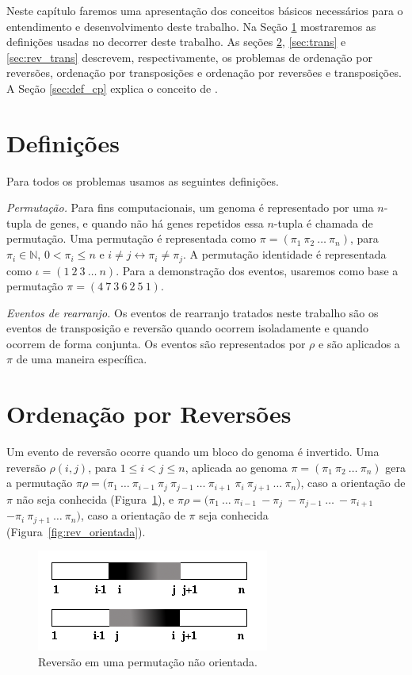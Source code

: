 Neste capítulo faremos uma apresentação dos conceitos básicos
necessários para o entendimento e desenvolvimento deste trabalho. Na
Seção \ref{sec:defin} mostraremos as definições usadas no decorrer
deste trabalho. As seções \ref{sec:rev}, \ref{sec:trans}
e \ref{sec:rev_trans} descrevem, respectivamente, os problemas de
ordenação por reversões, ordenação por transposições e ordenação por
reversões e transposições. A Seção \ref{sec:def_cp} explica o conceito
de \pr{}.

\section{Definições}
\label{sec:defin}
Para todos os problemas usamos as seguintes definições.

\textit{Permutação.} 
Para fins computacionais, um genoma é representado por uma $n$-tupla
de genes, e quando não há genes repetidos essa $n$-tupla é chamada de
permutação. Uma permutação é representada como $\pi =
(\pi_{1}~\pi_{2}~\ldots~\pi_{n})$, para $\pi_{i} \in \mathbb{N}$, $0
< \pi_{i} \leq n$ e $i \neq j \leftrightarrow \pi_{i} \neq \pi_{j}$. A
permutação identidade é representada como $\iota =
(1~2~3~\ldots~n)$. Para a demonstração dos eventos, usaremos como
base a permutação $\pi = (4~7~3~6~2~5~1)$.

\textit{Eventos de rearranjo.}
Os eventos de rearranjo tratados neste trabalho são os eventos de
transposição e reversão quando ocorrem isoladamente e quando ocorrem
de forma conjunta. Os eventos são representados por $\rho$ e são
aplicados a $\pi$ de uma maneira específica.

\section{Ordenação por Reversões}
\label{sec:rev}
Um evento de reversão ocorre quando um bloco do genoma é
invertido. Uma reversão $\rho(i, j)$, para $1 \leq i < j \leq n$,
aplicada ao genoma $\pi = (\pi_{1}~\pi_{2}~\ldots~\pi_{n})$ gera a
permutação $\pi\rho =
(\pi_{1}~\ldots~\pi_{i-1}~\pi_{j}~\pi_{j-1}~\ldots~\pi_{i+1}$
$\pi_{i}~ \pi_{j+1}~\ldots~\pi_{n})$, caso a orientação de $\pi$ não
seja conhecida (Figura~\ref{fig:rev_nao_orientada}), e $\pi\rho =
(\pi_{1}~\ldots~\pi_{i-1}~-\pi_{j}~-\pi_{j-1}~\ldots~-\pi_{i+1}$
$-\pi_{i}~ \pi_{j+1}~\ldots~\pi_{n})$, caso a orientação de $\pi$ seja
conhecida (Figura~\ref{fig:rev_orientada}).

\begin{figure}
  \centering
  \includegraphics{images/rev_nao_orientada.png} 
  \caption{Reversão em uma permutação não orientada.}
  \label{fig:rev_nao_orientada}
\end{figure}

